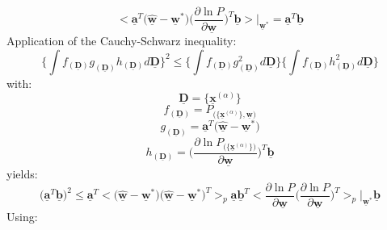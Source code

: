 \documentclass[a4paper,11pt]{article}
\begin{document}
\begin{equation}
	\Big< \underline{\mathbf{a}}^T \big(\hat{\underline{\mathbf{w}}} -
		\underline{\mathbf{w}}^* \big) 
		\Big( \frac{\partial \ln P}{\partial \underline{\mathbf{w}}}
		\Big)^T \underline{\mathbf{b}}
	\Big>\Big|_{\underline{\mathbf{w}}^*}
	= \underline{\mathbf{a}}^T \underline{\mathbf{b}}
\end{equation}
Application of the Cauchy-Schwarz inequality:
\begin{equation}
	\bigg\{ \int f_{(\underline{\mathbf{D}})} g_{(\underline{\mathbf{D}})}
		h_{(\underline{\mathbf{D}})} d \underline{\mathbf{D}}
	\bigg\}^2 \leq \bigg\{
		\int f_{(\underline{\mathbf{D}})} g_{(\underline{\mathbf{D}})}^2
		d \underline{\mathbf{D}}
	\bigg\} \bigg\{	
		\int f_{(\underline{\mathbf{D}})} h_{(\underline{\mathbf{D}})}^2
		d \underline{\mathbf{D}}
	\bigg\}
\end{equation}
with:
\[ \underline{\mathbf{D}} = \big\{\underline{\mathbf{x}}^{(\alpha)}\big\}
\]
\[ f_{(\underline{\mathbf{D}})} = P_{\big(\{\underline{\mathbf{x}}^{(\alpha)}\}
	, \underline{\mathbf{w}} \big)}
\]
\[ g_{(\underline{\mathbf{D}})} = \underline{\mathbf{a}}^T \big(
	\hat{\underline{\mathbf{w}}} - \underline{\mathbf{w}}^* \big)
\]
\[ h_{(\underline{\mathbf{D}})} = \Bigg(\frac{\partial \ln 
		P_{\big(\{\underline{\mathbf{x}}^{(\alpha)}\}\big)}}{
			\partial \underline{\mathbf{w}}}
	\Bigg)^T \underline{\mathbf{b}}
\]
yields:
\begin{equation}	
	\big( \underline{\mathbf{a}}^T \underline{\mathbf{b}} \big)^2
	\leq \underline{\mathbf{a}}^T \Big< \big( \hat{\underline{\mathbf{w}}}
		- \underline{\mathbf{w}}^* \big) 
	\big( \hat{\underline{\mathbf{w}}} - \underline{\mathbf{w}}^* \big)^T
	\Big>_p \underline{\mathbf{a}} \underline{\mathbf{b}}^T 
	\Big< \frac{\partial \ln P}{\partial \underline{\mathbf{w}}}
	  \Big( \frac{\partial \ln P}{\partial \underline{\mathbf{w}}} \Big)^T
	\Big>_p\bigg|_{\underline{\mathbf{w}}^*} \underline{\mathbf{b}}
\end{equation}
Using:
\end{document}
